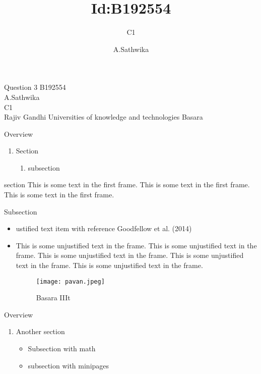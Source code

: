 \documentclass{beamer}
\title{Id:B192554}
\subtitle{C1}
\author{A.Sathwika}
\date{}
\begin{document}
\begin{frame}{Question 3}
  B192554\\
  A.Sathwika\\
  C1\\
 Rajiv Gandhi Universities of knowledge and technologies Basara
\end{frame}

\begin{frame}{Overview}
 \begin{enumerate}
     \item Section
     \begin{enumerate}
         \item subsection
     \end{enumerate}
 \end{enumerate}
\end{frame}

\begin{frame}{section}
This is some text in the first frame. This is some text in the first frame. This is some
text in the first frame.
\end{frame}

\begin{frame}{Subsection}
\begin{itemize}
    \item ustified text item with reference Goodfellow et al. (2014)
    \item This is some unjustified text in the frame. This is some unjustified text in the
frame. This is some unjustified text in the frame. This is some unjustified text in
the frame. This is some unjustified text in the frame.
\begin{figure}
    \centering
    \texttt{[image: pavan.jpeg]}
    \caption{Basara IIIt}
    \label{fig:my_label}
\end{figure}
\end{itemize}
\end{frame}

\begin{frame}{Overview}
    \begin{enumerate}
        \item Another section
        \begin{itemize}
            \item Subsection with math
            \item subsection with minipages
        \end{itemize}
    \end{enumerate}
\end{frame}
\end{document}

